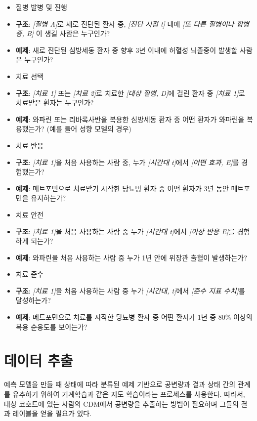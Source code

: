 \documentclass[10.5pt]{book}
\providecommand{\tightlist}{%
  \setlength{\itemsep}{0pt}\setlength{\parskip}{0pt}}
\theoremstyle{definition}
\theoremstyle{definition}
\theoremstyle{definition}
\theoremstyle{remark}
\begin{document}
\begin{itemize}
\tightlist
\item
  질병 발병 및 진행
\item
  \textbf{구조}: \emph{{[}질병 A{]}}로 새로 진단된 환자 중,
  \emph{{[}진단 시점 t{]}} 내에 \emph{{[}또 다른 질병이나 합병증, B{]}}
  이 생길 사람은 누구인가?
\item
  \textbf{예제}: 새로 진단된 심방세동 환자 중 향후 3년 이내에 허혈성
  뇌졸중이 발생할 사람은 누구인가?
\item
  치료 선택
\item
  \textbf{구조}: \emph{{[}치료 1{]}} 또는 \emph{{[}치료 2{]}}로 치료한
  \emph{{[}대상 질병, D{]}}에 걸린 환자 중 \emph{{[}치료 1{]}}로
  치료받은 환자는 누구인가?
\item
  \textbf{예제}: 와파린 또는 리바록사반을 복용한 심방세동 환자 중 어떤
  환자가 와파린을 복용했는가? (예를 들어 성향 모델의 경우)
\item
  치료 반응
\item
  \textbf{구조}: \emph{{[}치료 1{]}}을 처음 사용하는 사람 중, 누가
  \emph{{[}시간대 t{]}}에서 \emph{{[}어떤 효과, E{]}}를 경험했는가?
\item
  \textbf{예제}: 메트포민으로 치료받기 시작한 당뇨병 환자 중 어떤 환자가
  3년 동안 메트포민을 유지하는가?
\item
  치료 안전
\item
  \textbf{구조}: \emph{{[}치료 1{]}}을 처음 사용하는 사람 중 누가
  \emph{{[}시간대 t{]}}에서 \emph{{[}이상 반응 E{]}}를 경험하게 되는가?
\item
  \textbf{예제}: 와파린을 처음 사용하는 사람 중 누가 1년 안에 위장관
  출혈이 발생하는가?
\item
  치료 준수
\item
  \textbf{구조}: \emph{{[}치료 1{]}}을 처음 사용하는 사람 중 누가
  \emph{{[}시간대, t{]}}에서 \emph{{[}준수 지표 수치{]}}를 달성하는가?
\item
  \textbf{예제}: 메트포민으로 치료를 시작한 당뇨병 환자 중 어떤 환자가
  1년 중 80\% 이상의 복용 순응도를 보이는가?
\end{itemize}

\section{데이터 추출}\label{--1}

예측 모델을 만들 때 상태에 따라 분류된 예제 기반으로 공변량과 결과 상태
간의 관계를 유추하기 위하여 기계학습과 같은 지도 학습이라는 프로세스를
사용한다.  따라서, 대상 코호트에 있는 사람의
CDM에서 공변량을 추출하는 방법이 필요하며 그들의 결과 레이블을 얻을
필요가 있다.
\end{document}
